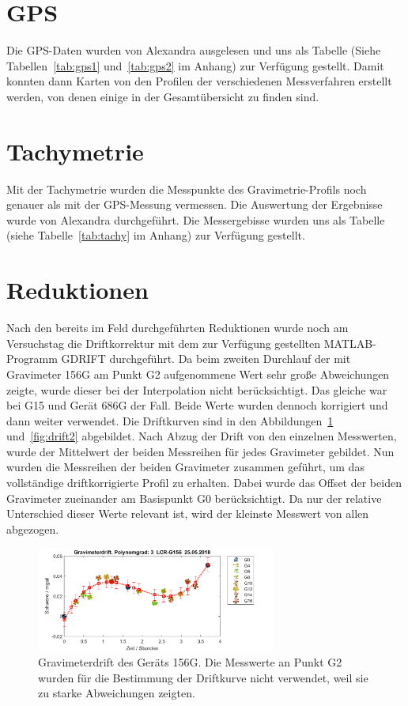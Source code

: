 \section{GPS}

Die GPS-Daten wurden von Alexandra ausgelesen und uns als Tabelle (Siehe Tabellen~\ref{tab:gps1} und~\ref{tab:gps2} im Anhang) zur Verfügung gestellt. Damit konnten dann Karten von den Profilen der verschiedenen Messverfahren erstellt werden, von denen einige in der Gesamtübersicht zu finden sind.

\section{Tachymetrie}

Mit der Tachymetrie wurden die Messpunkte des Gravimetrie-Profils noch genauer als mit der GPS-Messung vermessen. Die Auswertung der Ergebnisse wurde von Alexandra durchgeführt. Die Messergebisse wurden uns als Tabelle (siehe Tabelle~\ref{tab:tachy} im Anhang) zur Verfügung gestellt.

\section{Reduktionen}

Nach den bereits im Feld durchgeführten Reduktionen wurde noch am Versuchstag die Driftkorrektur mit dem zur Verfügung gestellten MATLAB-Programm GDRIFT durchgeführt. Da beim zweiten Durchlauf der mit Gravimeter 156G am Punkt G2 aufgenommene Wert sehr große Abweichungen zeigte, wurde dieser bei der Interpolation nicht berücksichtigt. Das gleiche war bei G15 und Gerät 686G der Fall. Beide Werte wurden dennoch korrigiert und dann weiter verwendet. Die Driftkurven sind in den Abbildungen~\ref{fig:drift1} und~\ref{fig:drift2} abgebildet. Nach Abzug der Drift von den einzelnen Messwerten, wurde der Mittelwert der beiden Messreihen für jedes Gravimeter gebildet. Nun wurden die Messreihen der beiden Gravimeter zusammen geführt, um das vollständige driftkorrigierte Profil zu erhalten. Dabei wurde das Offset der beiden Gravimeter zueinander am Basispunkt G0 berücksichtigt. Da nur der relative Unterschied dieser Werte relevant ist, wird der kleinste Messwert von allen abgezogen.

\begin{figure}[!ht]
 \centering
 \includegraphics[width=0.7\textwidth]{fig/G156drift_endgultig}
 \caption[Gravimeterdrift des Geräts 156G]{Gravimeterdrift des Geräts 156G. Die Messwerte an Punkt G2 wurden für die Bestimmung der Driftkurve nicht verwendet, weil sie zu starke Abweichungen zeigten.}
 \label{fig:drift1}
\end{figure}

